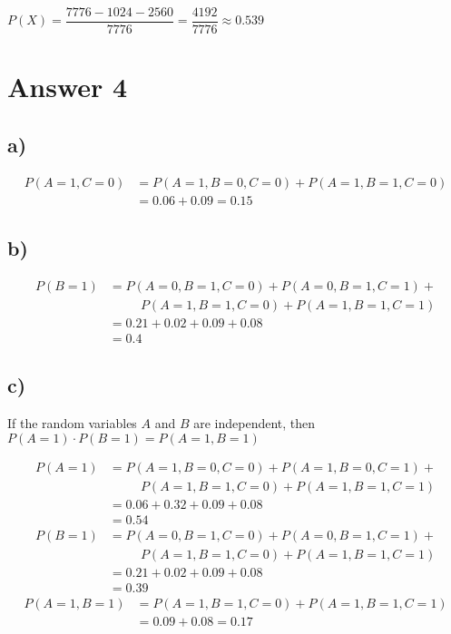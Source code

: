 \documentclass[12pt]{article}
\begin{document}
    \begin{center}
        $P(X) = \dfrac{7776 - 1024 - 2560}{7776} = \dfrac{4192}{7776} \approx 0.539$
    \end{center}{}
    
\section*{Answer 4}

\subsection*{a)}
    \begin{align*}
        P(A=1, C=0) &= P(A=1, B=0, C=0) + P(A=1, B=1, C=0) \\
        &= 0.06 + 0.09 = 0.15
    \end{align*}{}
    
\subsection*{b)}
    \begin{align*}
        P(B=1) &= P(A=0, B=1, C=0) + P(A=0, B=1, C=1) + \\
        &\;\;\;\;\;\;\;\;\;P(A=1, B=1, C=0) + P(A=1, B=1, C=1) \\
        &= 0.21 + 0.02 + 0.09 + 0.08 \\
        &= 0.4
    \end{align*}{}
    
\subsection*{c)}
    If the random variables $A$ and $B$ are independent, then $P(A=1) \cdot P(B=1) = P(A=1, B=1)$
    
    \begin{align*}
        P(A=1) &= P(A=1, B=0, C=0) + P(A=1, B=0, C=1) + \\
        &\;\;\;\;\;\;\;\;\;P(A=1, B=1, C=0) + P(A=1, B=1, C=1) \\
        &= 0.06 + 0.32 + 0.09 + 0.08 \\
        &= 0.54
    \end{align*}{}
    \begin{align*}
        P(B=1) &= P(A=0, B=1, C=0) + P(A=0, B=1, C=1) + \\
        &\;\;\;\;\;\;\;\;\;P(A=1, B=1, C=0) + P(A=1, B=1, C=1) \\
        &= 0.21 + 0.02 + 0.09 + 0.08 \\
        &= 0.39
    \end{align*}{}
    \begin{align*}
        P(A=1, B=1) &= P(A=1, B=1, C=0) + P(A=1, B=1, C=1) \\
        &= 0.09 + 0.08 = 0.17
    \end{align*}{}
    
\end{document}
